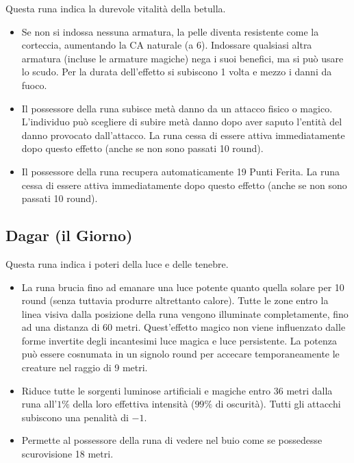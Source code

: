 \documentclass[10pt,a4paper]{article}
\begin{document}
Questa runa indica la durevole vitalit\`{a} della betulla.
  \begin{itemize}
\item       Se non si indossa nessuna armatura, la pelle diventa resistente come la corteccia, aumentando la CA naturale (a 6). Indossare qualsiasi altra armatura (incluse le armature magiche) nega i suoi benefici, ma si pu\`{o} usare lo scudo. Per la durata dell'effetto si subiscono 1 volta e mezzo i danni da fuoco.
 
\item       Il possessore della runa subisce met\`{a} danno da un attacco fisico o magico. L'individuo pu\`{o} scegliere di subire met\`{a} danno dopo aver saputo l'entit\`{a} del danno provocato dall'attacco. La runa cessa di essere attiva immediatamente dopo questo effetto (anche se non sono passati 10 round).
 
\item        Il possessore della runa recupera automaticamente 19 Punti Ferita. La runa cessa di essere attiva immediatamente dopo questo effetto (anche se non sono passati 10 round).
 \end{itemize}
 
 
\subsection*{Dagar (il Giorno)}
 
Questa runa indica i poteri della luce e delle tenebre.
  \begin{itemize}
\item       La runa brucia fino ad emanare una luce potente quanto quella solare per 10 round (senza tuttavia produrre altrettanto calore). Tutte le zone entro la linea visiva dalla posizione della runa vengono illuminate completamente, fino ad una distanza di 60 metri. Quest'effetto magico non viene influenzato dalle forme invertite degli incantesimi luce magica e luce persistente. La potenza pu\`{o} essere cosnumata in un signolo round per accecare temporaneamente le creature nel raggio di 9 metri.
 
\item       Riduce tutte le sorgenti luminose artificiali e magiche entro 36 metri dalla runa all'$1\%$ della loro effettiva intensit\`{a} ($99\%$ di oscurit\`{a}). Tutti gli attacchi subiscono una penalit\`{a} di $-1$.
 
\item        Permette al possessore della runa di vedere nel buio come se possedesse scurovisione 18 metri.
 \end{itemize}
 
\end{document}
